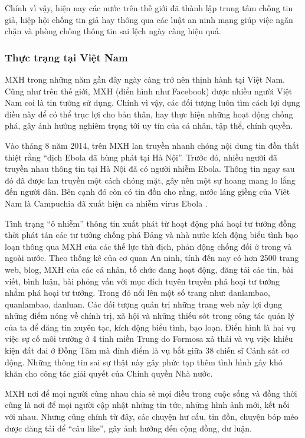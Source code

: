 		Chính vì vậy, hiện nay các nước trên thế giới đã thành lập trung tâm chống tin giả, hiệp hội chống tin giả hay thông qua các luật an ninh mạng giúp việc ngăn chặn và phòng chống thông tin sai lệch ngày càng hiệu quả.
		\subsubsection{Thực trạng tại Việt Nam}
		MXH trong những năm gần đây ngày càng trở nên thịnh hành tại Việt Nam. Cũng như trên thế giới, MXH (điển hình như Facebook) được nhiều người Việt Nam coi là tin tưởng sử dụng. Chính vì vậy, các đối tượng luôn tìm cách lợi dụng điều này để có thể trục lợi cho bản thân, hay thực hiện những hoạt động chống phá, gây ảnh hưởng nghiêm trọng tới uy tín của cá nhân, tập thể, chính quyền.
		
		Vào tháng 8 năm 2014, trên MXH lan truyền nhanh chóng nội dung tin đồn thất thiệt rằng “dịch Ebola đã bùng phát tại Hà Nội”. Trước đó, nhiều người đã truyền nhau thông tin tại Hà Nội đã có người nhiễm Ebola. Thông tin ngay sau đó đã được lan truyền một cách chóng mặt, gây nên một sự hoang mang lo lắng đến người dân. Bên cạnh đó còn có tin đồn cho rằng, nước láng giềng của Viêt Nam là Campuchia đã xuất hiện ca nhiễm virus Ebola \cite{ebola}.
		
		Tình trạng “ô nhiễm” thông tin xuất phát từ hoạt động phá hoại tư tưởng đồng thời phát tán các tư tưởng chống phá Đảng và nhà nước kích động biểu tình bạo loạn thông qua MXH của các thế lực thù địch, phản động chống đối ở trong và ngoài nước. Theo thống kê của cơ quan An ninh, tính đến nay có hơn 2500 trang web, blog, MXH của các cá nhân, tố chức đang hoạt động, đăng tải các tin, bài viết, bình luận, bài phỏng vấn với mục đích tuyên truyền phá hoại tư tưởng nhằm phá hoại tư tưởng. Trong đó nổi lên một số trang như: danlambao, quanlambao, danluan. Các đối tượng quản trị những trang web này lợi dụng những điểm nóng về chính trị, xã hội và những thiếu sót trong công tác quản lý của ta để đăng tin xuyên tạc, kích động biểu tình, bạo loạn. Điển hình là hai vụ việc sự cố môi trường ở 4 tỉnh miền Trung do Formosa xả thải \cite{formusa} và vụ việc khiếu kiện đất đai ở Đồng Tâm mà đỉnh điểm là vụ bắt giữa 38 chiến sĩ Cảnh sát cơ động. Những thông tin sai sự thật này gây phức tạp thêm tình hình gây khó khăn cho công tác giải quyết của Chính quyền Nhà nước.
		
		MXH nơi để mọi người cùng nhau chia sẻ mọi điều trong cuộc sống và đồng thời cũng là nơi để mọi người cập nhật những tin tức, những hình ảnh mới, kết nối với nhau. Nhưng cũng chính từ đây, các chuyện hư cấu, tin đồn, chuyện bóp méo được đăng tải để “câu like”, gây ảnh hưởng đến cộng đồng, dư luận.
		
